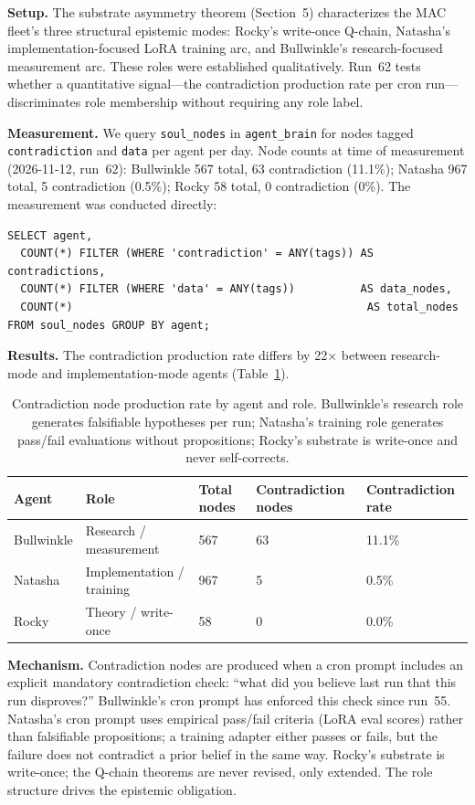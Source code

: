 \documentclass[11pt]{article}
\begin{document}
\textbf{Setup.} The substrate asymmetry theorem (Section~5) characterizes the MAC fleet's three structural epistemic modes: Rocky's write-once Q-chain, Natasha's implementation-focused LoRA training arc, and Bullwinkle's research-focused measurement arc. These roles were established qualitatively. Run~62 tests whether a quantitative signal---the contradiction production rate per cron run---discriminates role membership without requiring any role label.

\textbf{Measurement.} We query \texttt{soul\_nodes} in \texttt{agent\_brain} for nodes tagged \texttt{contradiction} and \texttt{data} per agent per day. Node counts at time of measurement (2026-11-12, run~62): Bullwinkle 567 total, 63 contradiction (11.1\%); Natasha 967 total, 5 contradiction (0.5\%); Rocky 58 total, 0 contradiction (0\%). The measurement was conducted directly:

\begin{verbatim}
SELECT agent,
  COUNT(*) FILTER (WHERE 'contradiction' = ANY(tags)) AS contradictions,
  COUNT(*) FILTER (WHERE 'data' = ANY(tags))          AS data_nodes,
  COUNT(*)                                             AS total_nodes
FROM soul_nodes GROUP BY agent;
\end{verbatim}

\textbf{Results.} The contradiction production rate differs by 22$\times$ between research-mode and implementation-mode agents (Table~\ref{tab:epistemic-mode}).

\begin{table}[h]
\centering
\begin{tabular}{lllll}
\hline
Agent & Role & Total nodes & Contradiction nodes & Contradiction rate \\
\hline
Bullwinkle & Research / measurement  & 567 & 63 & 11.1\% \\
Natasha    & Implementation / training & 967 &  5 &  0.5\% \\
Rocky      & Theory / write-once       &  58 &  0 &  0.0\% \\
\hline
\end{tabular}
\caption{Contradiction node production rate by agent and role. Bullwinkle's research role generates falsifiable hypotheses per run; Natasha's training role generates pass/fail evaluations without propositions; Rocky's substrate is write-once and never self-corrects.}
\label{tab:epistemic-mode}
\end{table}

\textbf{Mechanism.} Contradiction nodes are produced when a cron prompt includes an explicit mandatory contradiction check: ``what did you believe last run that this run disproves?'' Bullwinkle's cron prompt has enforced this check since run~55. Natasha's cron prompt uses empirical pass/fail criteria (LoRA eval scores) rather than falsifiable propositions; a training adapter either passes or fails, but the failure does not contradict a prior belief in the same way. Rocky's substrate is write-once; the Q-chain theorems are never revised, only extended. The role structure drives the epistemic obligation.
\end{document}

